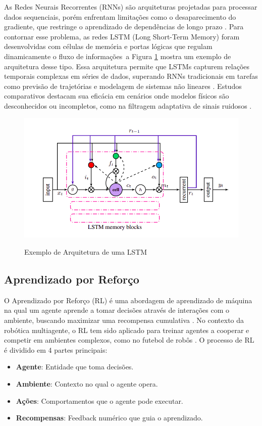 As Redes Neurais Recorrentes (RNNs) são arquiteturas projetadas para processar dados sequenciais, porém enfrentam limitações como o desaparecimento do gradiente, que restringe o aprendizado de dependências de longo prazo \cite{hochreiter1997long}. Para contornar esse problema, as redes LSTM (Long Short-Term Memory) foram desenvolvidas com células de memória e portas lógicas que regulam dinamicamente o fluxo de informações\ a Figura \ref{fig:LSTM} mostra um exemplo de arquitetura desse tipo. Essa arquitetura permite que LSTMs capturem relações temporais complexas em séries de dados, superando RNNs tradicionais em tarefas como previsão de trajetórias e modelagem de sistemas não lineares \cite{gers2000learning}. Estudos comparativos destacam sua eficácia em cenários onde modelos físicos são desconhecidos ou incompletos, como na filtragem adaptativa de sinais ruidosos \cite{greff2017lstm}.

\begin{figure}
    \centering
    \caption{Exemplo de Arquitetura de uma LSTM}
    \includegraphics[width=0.7\linewidth]{figuras/LSTM.png}
    \label{fig:LSTM}
\end{figure}

\subsection{Aprendizado por Reforço}

O Aprendizado por Reforço (RL) é uma abordagem de aprendizado de máquina na qual um agente aprende a tomar decisões através de interações com o ambiente, buscando maximizar uma recompensa cumulativa \cite{Sutton2018}. No contexto da robótica multiagente, o RL tem sido aplicado para treinar agentes a cooperar e competir em ambientes complexos, como no futebol de robôs \cite{Stone2005}. O processo de RL é dividido em 4 partes principais:

\begin{itemize}
    \item \textbf{Agente}: Entidade que toma decisões.
    \item \textbf{Ambiente}: Contexto no qual o agente opera.
    \item \textbf{Ações}: Comportamentos que o agente pode executar.
    \item \textbf{Recompensas}: Feedback numérico que guia o aprendizado.
\end{itemize}

